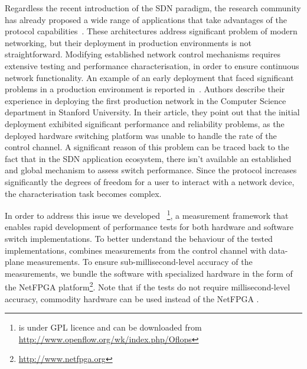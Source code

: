
Regardless the recent introduction of the SDN paradigm, the research community
has already proposed a wide range of applications that take advantages of the
protocol capabilities~\cite{plug_n_serv,difane,flowvisor-osdi}. These
architectures address significant problem of modern networking, but their
deployment in production environments is not straightforward.  Modifying
established network control mechanisms requires extensive testing and
performance characterisation, in order to ensure continuous network
functionality.  An example of an early \of deployment that faced significant
problems in a production environment is reported in~\cite{Weissmann:va}. Authors
describe their experience in deploying the first \of production network in the
Computer Science department in Stanford University. In their article, they point
out that the initial deployment exhibited significant performance and
reliability problems, as the deployed hardware switching platform was unable to
handle the rate of the control channel. A significant reason of this problem can
be traced back to the fact that in the SDN application ecosystem, there isn't
available an established and global mechanism to assess switch performance.
Since the \of protocol increases significantly the degrees of freedom for a user
to interact with a network device, the characterisation task becomes complex. 

In order to address this issue we developed
\oflops~\footnote{\oflops is under GPL licence and can be downloaded from
  \url{http://www.openflow.org/wk/index.php/Oflops}}, a measurement framework
that enables rapid development of performance tests for both hardware and software
\of switch implementations. To better understand the behaviour of the tested
\of implementations, \oflops combines measurements from the \of
control channel with data-plane measurements. To ensure sub-millisecond-level
accuracy of the measurements, we bundle the \oflops software with specialized
hardware in the form of the NetFPGA
platform\footnote{\url{http://www.netfpga.org}}.  Note that if the tests do not
require millisecond-level accuracy, commodity hardware can be used instead of
the NetFPGA \cite{pam-accuracy}.



